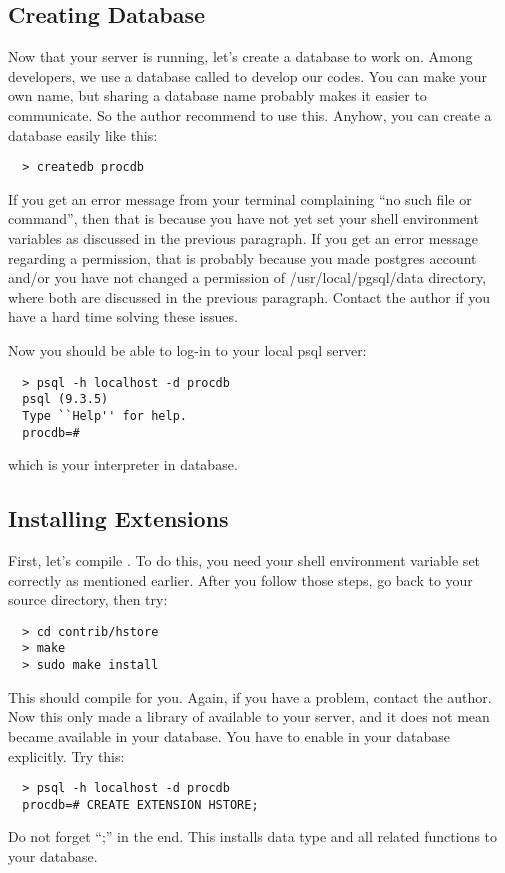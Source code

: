 \subsection{Creating Database}
Now that your server is running, let's create a database to work on. Among {\pubs} developers,
we use a database called {\procdb} to develop our codes. You can make your own name, but sharing
a database name probably makes it easier to communicate. So the author recommend to use this.
Anyhow, you can create a database easily like this:
\begin{lstlisting}
  > createdb procdb
\end{lstlisting}
If you get an error message from your terminal complaining ``no such file or command'', then that
is because you have not yet set your shell environment variables as discussed in the previous
paragraph. If you get an error message regarding a permission, that is probably because you made
{\ttfamily postgres} account and/or you have not changed a permission of 
{\ttfamily /usr/local/pgsql/data} directory, where both are discussed in the previous paragraph.
Contact the author if you have a hard time solving these issues.

Now you should be able to log-in to your local psql server:
\begin{lstlisting}
  > psql -h localhost -d procdb 
  psql (9.3.5)
  Type ``Help'' for help.
  procdb=# 
\end{lstlisting}
which is your {\psql} interpreter in {\procdb} database.

\subsection{Installing {\hstore} Extensions}

First, let's compile {\hstore}. To do this, you need your shell environment variable set 
correctly as mentioned earlier. After you follow those steps, go back to 
your {\psql} source directory, then try:
\begin{lstlisting}
  > cd contrib/hstore
  > make
  > sudo make install
\end{lstlisting}
This should compile {\hstore} for you. Again, if you have a problem, contact the author.
Now this only made a library of {\hstore} available to your server, and it does not mean 
{\hstore} became available in your database. You have to enable {\hstore} in your database 
explicitly. Try this:
\begin{lstlisting}
  > psql -h localhost -d procdb
  procdb=# CREATE EXTENSION HSTORE;
\end{lstlisting}
Do not forget ``;'' in the end. This installs {\hstore} data type and all related functions
to your {\procdb} database.

